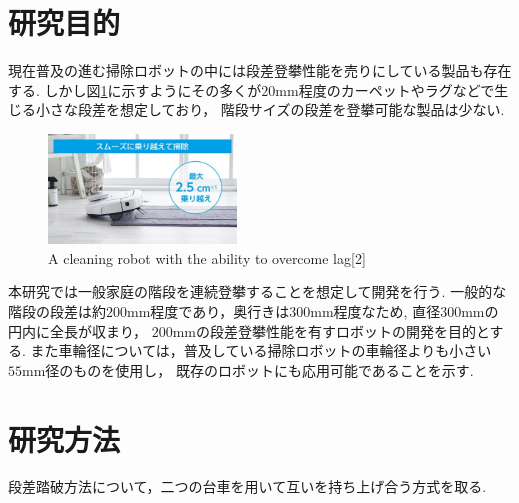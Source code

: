 \documentclass[dvipdfmx]{jsarticle}
\begin{document}
\section{研究目的}
現在普及の進む掃除ロボットの中には段差登攀性能を売りにしている製品も存在する.
しかし図\ref{fig:rulo}に示すようにその多くが$20\mathrm{mm}$程度のカーペットやラグなどで生じる小さな段差を想定しており，
階段サイズの段差を登攀可能な製品は少ない.
\begin{figure}[H]
  \centering
  \includegraphics[width=50mm]{image/rulo.jpg}
  \caption{A cleaning robot with the ability to overcome lag[2]}
\label{fig:rulo}
\end{figure}

本研究では一般家庭の階段を連続登攀することを想定して開発を行う.
一般的な階段の段差は約$200\mathrm{mm}$程度であり，奥行きは$300\mathrm{mm}$程度なため,
直径$300\mathrm{mm}$の円内に全長が収まり，
$200\mathrm{mm}$の段差登攀性能を有すロボットの開発を目的とする.
また車輪径については，普及している掃除ロボットの車輪径よりも小さい$55\mathrm{mm}$径のものを使用し，
既存のロボットにも応用可能であることを示す.

\section{研究方法}
段差踏破方法について，二つの台車を用いて互いを持ち上げ合う方式を取る.
\end{document}
